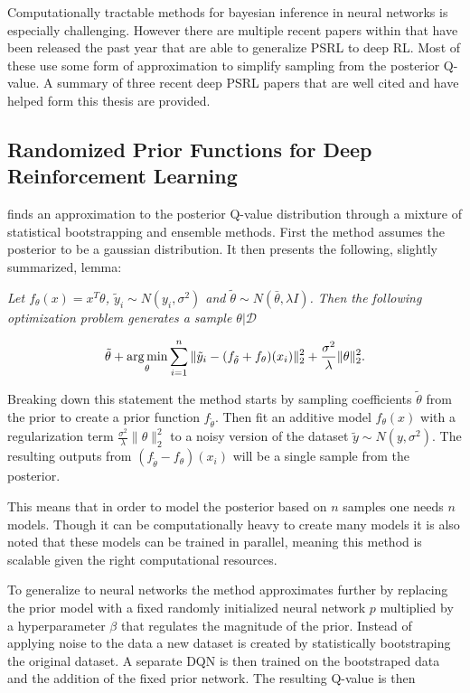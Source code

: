 Computationally tractable methods for bayesian inference in neural networks is especially challenging. However there are multiple recent papers within that have been released the past year that are able to generalize PSRL to deep RL. Most of these use some form of approximation to simplify sampling from the posterior Q-value. A summary of three recent deep PSRL papers that are well cited and have helped form this thesis are provided.

\subsection{Randomized Prior Functions for Deep Reinforcement Learning}

\cite{osband_2018} finds an approximation to the posterior Q-value distribution through a mixture of statistical bootstrapping and ensemble methods. First the method assumes the posterior to be a gaussian distribution. It then presents the following, slightly summarized, lemma:


\textit{Let $f_\theta (x) = x^T\theta$, $\tilde{y}_i\sim N(y_i,\sigma^2)$ and $\tilde{\theta} \sim N(\bar{\theta}, \lambda I)$. Then the following optimization problem generates a sample $\theta | \mathcal{D}$}

\begin{equation}
    \tilde{\theta} + \operatorname*{arg\,min}_\theta \sum_{i=1}^n\|\tilde{y}_i-(f_{\tilde{\theta}} + f_\theta)(x_i)\|_2^2 + \frac{\sigma^2}{\lambda}\|\theta\|_2^2.
\end{equation}

Breaking down this statement the method starts by sampling coefficients $\tilde{\theta}$ from the prior to create a prior function $f_{\tilde{\theta}}$. Then fit an additive model $f_\theta(x)$ with a regularization term $\frac{\sigma^2}{\lambda}\|\theta\|_2^2$ to a noisy version of the dataset $\tilde{y} \sim N(y, \sigma^2)$. The resulting outputs from $(f_{\tilde{\theta}}-f_{\theta})(x_i)$ will be a single sample from the posterior. 

This means that in order to model the posterior based on $n$ samples one needs $n$ models. Though it can be computationally heavy to create many models it is also noted that these models can be trained in parallel, meaning this method is scalable given the right computational resources.

To generalize to neural networks the method approximates further by replacing the prior model with a fixed randomly initialized neural network $p$ multiplied by a hyperparameter $\beta$ that regulates the magnitude of the prior. Instead of applying noise to the data a new dataset is created by statistically bootstraping the original dataset. A separate DQN is then trained on the bootstraped data and the addition of the fixed prior network. The resulting Q-value is then 


